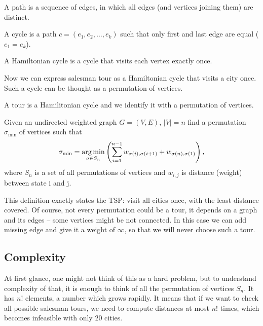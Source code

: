 	\begin{definition}
		A path is a sequence of edges, in which all edges (and vertices joining them) are distinct.
	\end{definition}
	\begin{definition}
		A cycle is a path $c = (e_1, e_2, \ldots, e_k)$ such that only first and last edge are equal ($e_1 = e_k$).
	\end{definition}
	\begin{definition}
		A Hamiltonian cycle is a cycle that visits each vertex exactly once.
	\end{definition}
	Now we can express salesman tour as a Hamiltonian cycle that visits a city once. Such a cycle can be thought as a permutation of vertices.
	\begin{definition}
		A tour is a Hamilitonian cycle and we identify it with a permutation of vertices.
	\end{definition}
	
	\begin{definition}
		Given an undirected weighted graph $G = (V, E)$, $|V| = n$ find a permutation $\sigma_{\min}$ of vertices such that
		\begin{equation*}
			\sigma_{\min} = \underset{\sigma \in S_n}{\operatorname*{arg\,min}} \left( \sum_{i=1}^{n-1} w_{\sigma(i), \sigma(i+1)} + w_{\sigma(n), \sigma(1)} \right),
		\end{equation*}
		where $S_n$ is a set of all permutations of vertices and $w_{i,j}$ is distance (weight) between state i and j.
	\end{definition}
	This definition exactly states the TSP: visit all cities once, with the least distance covered. Of course, not every permutation could be a tour, it depends on a graph and its edges -- some vertices might be not connected. In this case we can add missing edge and give it a weight of $\infty$, so that we will never choose such a tour.
	
\subsection{Complexity}
	At first glance, one might not think of this as a hard problem, but to understand complexity of that, it is enough to think of all the permutation of vertices $S_n$. It has $n!$ elements, a number which grows rapidly. It means that if we want to check all possible salesman tours, we need to compute distances at most $n!$ times, which becomes infeasible with only $20$ cities. 
	
